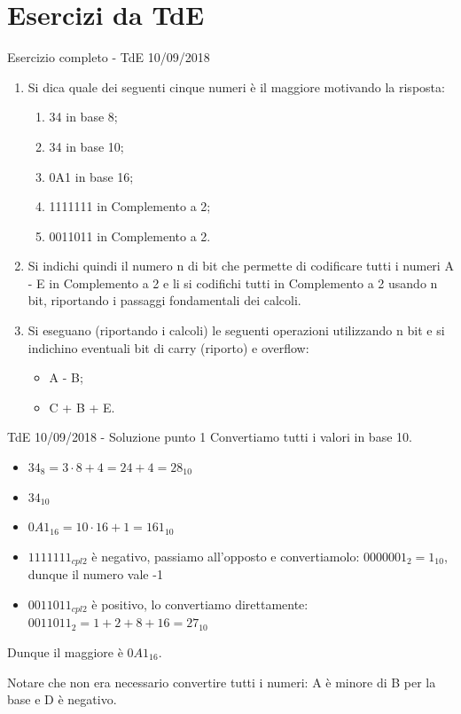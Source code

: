 \documentclass[aspectratio=169]{beamer}
\begin{document}
\section{Esercizi da TdE}

\begin{frame}{Esercizio completo - TdE 10/09/2018}
\begin{enumerate}
	\item Si dica quale dei seguenti cinque numeri è il maggiore motivando la risposta:
    \begin{enumerate}
		\item 34 in base 8;
		\item 34 in base 10;
		\item 0A1 in base 16;
		\item 1111111 in Complemento a 2;
		\item 0011011 in Complemento a 2.
	\end{enumerate}

	\item Si indichi quindi il numero n di bit che permette di codificare tutti i numeri A - E in Complemento a 2 e li si codifichi tutti in Complemento a 2 usando n bit, riportando i passaggi fondamentali dei calcoli.

	\item Si eseguano (riportando i calcoli) le seguenti operazioni utilizzando n bit e si indichino eventuali bit di carry (riporto) e overflow:
	\begin{itemize}
		\item A - B;
		\item C + B + E.
	\end{itemize}
\end{enumerate}
\end{frame}

\begin{frame}{TdE 10/09/2018 - Soluzione punto 1}
Convertiamo tutti i valori in base 10.
	\begin{itemize}
		\item $34_8 = 3 \cdot 8 +  4 = 24+4 = 28_{10}$
		\item $34_{10}$
		\item $0A1_{16} = 10 \cdot 16 + 1 = 161_{10}$
		\item $1111111_{cpl2}$ è negativo, passiamo all'opposto e convertiamolo: $0000001_2 = 1_{10}$, dunque il numero vale -1
		\item $0011011_{cpl2}$ è positivo, lo convertiamo direttamente: $0011011_2 = 1+2+8+16 = 27_{10}$
	\end{itemize}

Dunque il maggiore è $0A1_{16}$.

Notare che non era necessario convertire tutti i numeri: A è minore di B per la base e D è negativo.
\end{frame}
\end{document}
